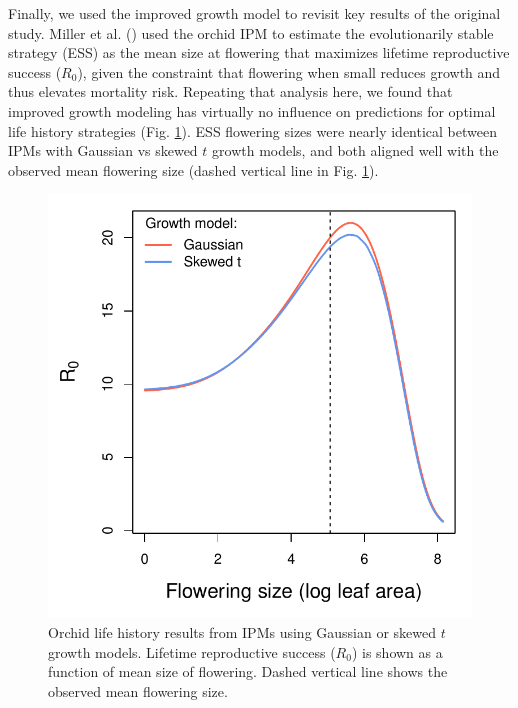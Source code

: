 \documentclass[12pt]{article}
\newcommand{\tom}[2]{{\color{red}{#1}}\footnote{\textit{\color{red}{#2}}}}
\begin{document}
Finally, we used the improved growth model to revisit key results of the original study. 
Miller et al. (\citeyear{miller2012evolutionary}) used the orchid IPM to estimate the evolutionarily stable strategy (ESS) as the mean size at flowering that maximizes lifetime reproductive success ($R_0$), given the constraint that flowering when small reduces growth and thus elevates mortality risk. 
Repeating that analysis here, we found that improved growth modeling has virtually no influence on predictions for optimal life history strategies (Fig. \ref{fig:orchid_ESS}). 
ESS flowering sizes were nearly identical between IPMs with Gaussian vs skewed $t$ growth models, and both aligned well with the observed mean flowering size (dashed vertical line in Fig. \ref{fig:orchid_ESS}). 

\begin{figure}[tbp]
	\centering
	\includegraphics[width=1.0\textwidth]{figures/orchid_R0.pdf}
	\caption{Orchid life history results from IPMs using Gaussian or skewed $t$ growth models. Lifetime reproductive success ($R_0$) is shown as a function of mean size of flowering. Dashed vertical line shows the observed mean flowering size.}
	\label{fig:orchid_ESS}
\end{figure} 
\end{document}
